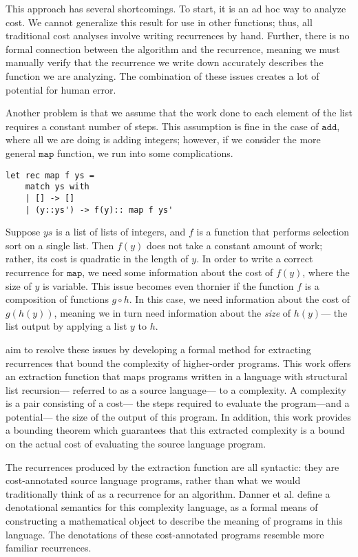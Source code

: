 This approach has several shortcomings. To start, it is an ad hoc way to analyze cost. We cannot generalize
this result for use in other functions; thus, all traditional cost analyses involve writing recurrences by hand. Further, there 
is no formal connection between the algorithm and the recurrence, meaning we must manually verify that the recurrence
we write down accurately describes the function we are analyzing. The combination of these issues creates a lot of 
potential for human error.

Another problem is that we assume that the work done to each element of the list requires a constant number of steps. 
This assumption is fine in the case of $\texttt{add}$, where all we are doing is adding integers; however, if we consider
the more general $\texttt{map}$ function, we run into some complications. 
\begin{verbatim}
let rec map f ys =
	match ys with
	| [] -> []
	| (y::ys') -> f(y):: map f ys'
\end{verbatim}
Suppose $ys$ is a list of lists of integers, and $f$ is a function that performs selection sort on a single list. Then $f(y)$ does
not take a constant amount of work; rather, its cost is quadratic in the length of $y$. In order to write a correct recurrence
for $\texttt{map}$, we need some information about the cost of $f(y)$, where the size of $y$ is variable. This issue
becomes even thornier if the function $f$ is a composition of functions $g \circ h$. In this case, we need information about the cost of $g(h(y))$, meaning we in turn need information about the \emph{size} of $h(y)$--- the list output by applying a list $y$ to $h$. 

\cite{N.-Danner:2015aa} aim to resolve these issues by developing a formal method for extracting
recurrences that bound the complexity of higher-order programs. This work offers an extraction function that maps 
programs written in a language with structural list recursion--- referred to as a source language--- to a complexity. A 
complexity is a pair consisting of a cost--- the steps required to evaluate the program---and a potential--- the size of the 
output of this program. In addition, this work provides a bounding theorem which guarantees that this extracted complexity is 
a bound on the actual cost of evaluating the source language program. 

The recurrences produced by the extraction function are all syntactic: they are cost-annotated source language
programs, rather than what we would traditionally think of as a recurrence for an algorithm. Danner et al. define a 
denotational semantics for this complexity language, as a formal means of constructing a mathematical object to
describe the meaning of programs in this language. The denotations of these cost-annotated programs resemble
more familiar recurrences.

